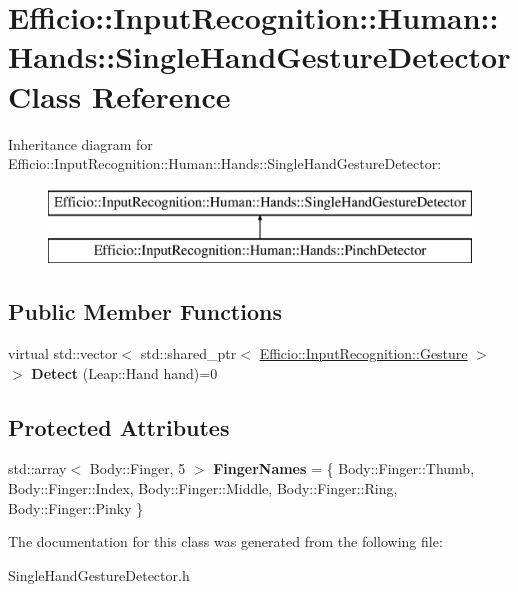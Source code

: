 \hypertarget{class_efficio_1_1_input_recognition_1_1_human_1_1_hands_1_1_single_hand_gesture_detector}{}\section{Efficio\+:\+:Input\+Recognition\+:\+:Human\+:\+:Hands\+:\+:Single\+Hand\+Gesture\+Detector Class Reference}
\label{class_efficio_1_1_input_recognition_1_1_human_1_1_hands_1_1_single_hand_gesture_detector}
Inheritance diagram for Efficio\+:\+:Input\+Recognition\+:\+:Human\+:\+:Hands\+:\+:Single\+Hand\+Gesture\+Detector\+:\begin{figure}[H]
\begin{center}
\leavevmode
\includegraphics[height=2.000000cm]{class_efficio_1_1_input_recognition_1_1_human_1_1_hands_1_1_single_hand_gesture_detector}
\end{center}
\end{figure}
\subsection*{Public Member Functions}
\begin{DoxyCompactItemize}
\item 
virtual std\+::vector$<$ std\+::shared\+\_\+ptr$<$ \hyperlink{class_efficio_1_1_input_recognition_1_1_gesture}{Efficio\+::\+Input\+Recognition\+::\+Gesture} $>$ $>$ {\bfseries Detect} (Leap\+::\+Hand hand)=0\hypertarget{class_efficio_1_1_input_recognition_1_1_human_1_1_hands_1_1_single_hand_gesture_detector_a6fb83b598c1f11539f6c49495c987994}{}\label{class_efficio_1_1_input_recognition_1_1_human_1_1_hands_1_1_single_hand_gesture_detector_a6fb83b598c1f11539f6c49495c987994}

\end{DoxyCompactItemize}
\subsection*{Protected Attributes}
\begin{DoxyCompactItemize}
\item 
std\+::array$<$ Body\+::\+Finger, 5 $>$ {\bfseries Finger\+Names} = \{ Body\+::\+Finger\+::\+Thumb, Body\+::\+Finger\+::\+Index, Body\+::\+Finger\+::\+Middle, Body\+::\+Finger\+::\+Ring, Body\+::\+Finger\+::\+Pinky \}\hypertarget{class_efficio_1_1_input_recognition_1_1_human_1_1_hands_1_1_single_hand_gesture_detector_a1dda643bda61df03535396dd659acb91}{}\label{class_efficio_1_1_input_recognition_1_1_human_1_1_hands_1_1_single_hand_gesture_detector_a1dda643bda61df03535396dd659acb91}

\end{DoxyCompactItemize}


The documentation for this class was generated from the following file\+:\begin{DoxyCompactItemize}
\item 
Single\+Hand\+Gesture\+Detector.\+h\end{DoxyCompactItemize}
